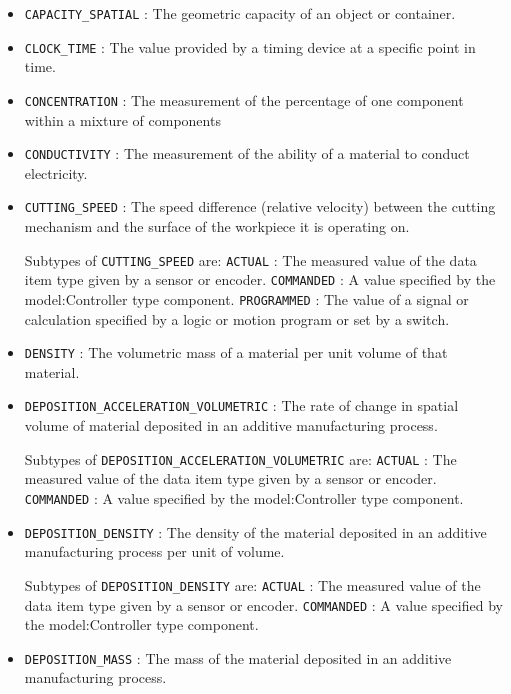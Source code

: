 \begin{itemize}
\item \texttt{CAPACITY_SPATIAL} : The geometric capacity of an object or container. 

\item \texttt{CLOCK_TIME} : The value provided by a timing device at a specific point in time. 

\item \texttt{CONCENTRATION} : The measurement of the percentage of one component within a mixture of components 

\item \texttt{CONDUCTIVITY} : The measurement of the ability of a material to conduct electricity. 

\item \texttt{CUTTING_SPEED} : The speed difference (relative velocity) between the cutting mechanism and the surface of the workpiece it is operating on. 

Subtypes of \texttt{CUTTING_SPEED} are: 
\newline\tab \texttt{ACTUAL} : The measured value of the data item type given by a sensor or encoder. 
\newline\tab \texttt{COMMANDED} : A value specified by the {model:Controller} type component. 
\newline\tab \texttt{PROGRAMMED} : The value of a signal or calculation specified by a logic or motion program or set by a switch. 
\item \texttt{DENSITY} : The volumetric mass of a material per unit volume of that material. 

\item \texttt{DEPOSITION_ACCELERATION_VOLUMETRIC} : The rate of change in spatial volume of material deposited in an additive manufacturing process. 

Subtypes of \texttt{DEPOSITION_ACCELERATION_VOLUMETRIC} are: 
\newline\tab \texttt{ACTUAL} : The measured value of the data item type given by a sensor or encoder. 
\newline\tab \texttt{COMMANDED} : A value specified by the {model:Controller} type component. 
\item \texttt{DEPOSITION_DENSITY} : The density of the material deposited in an additive manufacturing process per unit of volume. 

Subtypes of \texttt{DEPOSITION_DENSITY} are: 
\newline\tab \texttt{ACTUAL} : The measured value of the data item type given by a sensor or encoder. 
\newline\tab \texttt{COMMANDED} : A value specified by the {model:Controller} type component. 
\item \texttt{DEPOSITION_MASS} : The mass of the material deposited in an additive manufacturing process. 


\end{itemize}
